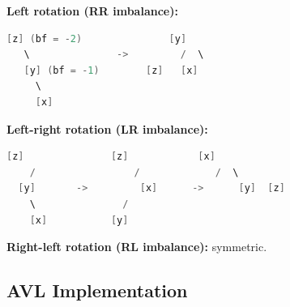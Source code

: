 \textbf{Left rotation (RR imbalance):}

\begin{lstlisting}[language=Java]
[z] (bf = -2)               [y]
   \               ->         /  \
   [y] (bf = -1)        [z]   [x]
     \
     [x]
\end{lstlisting}

\textbf{Left-right rotation (LR imbalance):}

\begin{lstlisting}[language=Java]
    [z]               [z]            [x]
    /                 /             /  \
  [y]       ->         [x]      ->      [y]  [z]
    \               /
    [x]           [y]
\end{lstlisting}

\textbf{Right-left rotation (RL imbalance):} symmetric.

\subsection{AVL Implementation}

